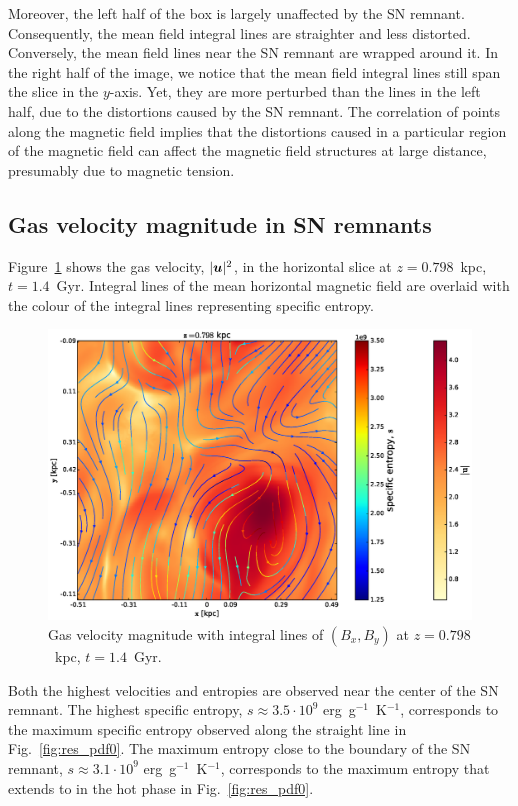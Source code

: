 \documentclass[useAMS,usenatbib]{mn2e}
\begin{document}
Moreover, the left half of the box is largely unaffected by the SN remnant. Consequently, the mean field integral lines are straighter and less distorted. Conversely, the mean field lines near the SN remnant are wrapped around it. In the right half of the image, we notice that the mean field integral lines still span the slice in the $y$-axis. Yet, they are more perturbed than the lines in the left half, due to the distortions caused by the SN remnant. The correlation of points along the magnetic field implies that the distortions caused in a particular region of the magnetic field can affect the magnetic field structures at large distance, presumably due to magnetic tension.  
\subsection{Gas velocity magnitude in SN remnants}
Figure~\ref{fig:uu_800} shows the gas velocity, $|\boldsymbol{u}|^2$, in the horizontal slice at $z=0.798$~kpc, $t=1.4$~Gyr. Integral lines of the mean horizontal magnetic field are overlaid with the colour of the integral lines representing specific entropy.
\begin{figure}
\includegraphics[width = \linewidth]{fig/uu_slice_800pc.eps}
\caption{Gas velocity magnitude with integral lines of $(B_x,B_y)$ at $z=0.798$~kpc, $t=1.4$~Gyr.}
\label{fig:uu_800}
\end{figure}
Both the highest velocities and entropies are observed near the center of the SN remnant. The highest specific entropy, $s\approx3.5\cdot10^9$ erg~g$^{-1}$~K$^{-1}$, corresponds to the maximum specific entropy observed along the straight line in Fig.~\ref{fig:res_pdf0}. The maximum entropy close to the boundary of the SN remnant, $s\approx3.1\cdot10^9$ erg~g$^{-1}$~K$^{-1}$, corresponds to the maximum entropy that \meanprs extends to in the hot phase in Fig.~\ref{fig:res_pdf0}. 
\end{document}
